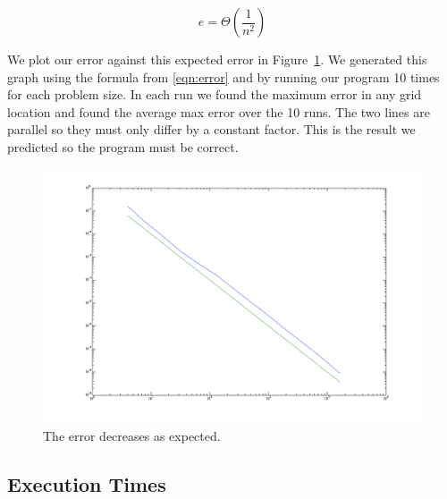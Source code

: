 \documentclass{article}
\begin{document}
	\begin{equation}
		\label{eqn:error}
		e = \Theta(\frac{1}{n^2})
	\end{equation}

	We plot our error against this expected error in Figure~\ref{fig:errorGraph}. We generated this graph using the formula from \ref{eqn:error} and by running our program 10 times for each problem size. In each run we found the maximum error in any grid location and found the average max error over the 10 runs. The two lines are parallel so they must only differ by a constant factor. This is the result we predicted so the program must be correct.

	\begin{figure}[htbp]
	\begin{center}
	\includegraphics[width=15cm,keepaspectratio=true]{figs/errorGraph}
	\caption{The error decreases as expected.}
	\label{fig:errorGraph}
	\end{center}
	\end{figure}

\subsection{Execution Times}
\end{document}
